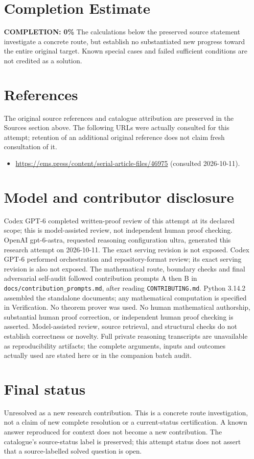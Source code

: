 \documentclass[11pt]{article}
\begin{document}
\section{Completion Estimate}
\noindent\textbf{COMPLETION: 0\%}
The calculations below the preserved source statement investigate a concrete route,
but establish no substantiated new progress toward the entire original target.
Known special cases and failed sufficient conditions are not credited as a solution.
\section{References}
The original source references and catalogue attribution are preserved in the
Sources section above. The following URLs were actually consulted for this attempt;
retention of an additional original reference does not claim fresh consultation of it.
\begin{itemize}
\item \url{https://ems.press/content/serial-article-files/46975} (consulted 2026-10-11). 
\end{itemize}
\section{Model and contributor disclosure}
Codex GPT-6 completed written-proof review of this attempt at its declared scope; this is model-assisted review, not independent human proof checking.
OpenAI gpt-6-astra, requested reasoning configuration ultra, generated this research
attempt on 2026-10-11. The exact serving revision is not exposed. Codex GPT-6
performed orchestration and repository-format review; its exact serving revision
is also not exposed. The mathematical route, boundary checks and final adversarial
self-audit followed contribution prompts A then B in
\texttt{docs/contribution\_prompts.md}, after reading \texttt{CONTRIBUTING.md}.
Python 3.14.2 assembled the standalone documents; any mathematical computation is
specified in Verification. No theorem prover was used. No human mathematical
authorship, substantial human proof correction, or independent human proof checking
is asserted. Model-assisted review, source retrieval, and structural checks do not
establish correctness or novelty. Full private reasoning transcripts are unavailable
as reproducibility artifacts; the complete arguments, inputs and outcomes actually
used are stated here or in the companion batch audit.
\section{Final status}
Unresolved as a new research contribution. This is a concrete route investigation,
not a claim of new complete resolution or a current-status certification. A known
answer reproduced for context does not become a new contribution. The catalogue's
source-status label is preserved; this attempt status does not assert that a
source-labelled solved question is open.
\end{document}
